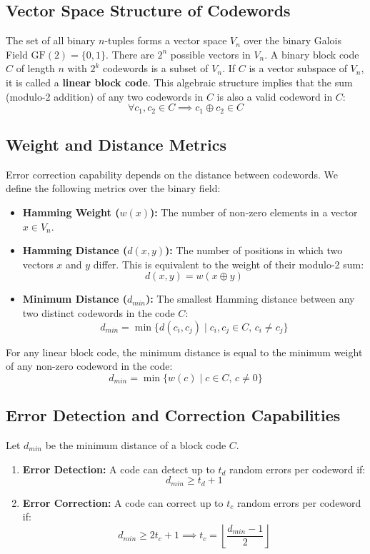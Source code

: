 \documentclass[12pt,a4paper]{article}
\begin{document}
\subsection{Vector Space Structure of Codewords}
The set of all binary $n$-tuples forms a vector space $V_n$ over the binary Galois Field $\text{GF}(2) = \{0, 1\}$. There are $2^n$ possible vectors in $V_n$. A binary block code $C$ of length $n$ with $2^k$ codewords is a subset of $V_n$. If $C$ is a vector subspace of $V_n$, it is called a \textbf{linear block code}. This algebraic structure implies that the sum (modulo-2 addition) of any two codewords in $C$ is also a valid codeword in $C$:
\[ \forall c_1, c_2 \in C \implies c_1 \oplus c_2 \in C \]

\subsection{Weight and Distance Metrics}
Error correction capability depends on the distance between codewords. We define the following metrics over the binary field:
\begin{tcolorbox}[defbox, title={\textbf{Weight and Distance Definitions}}]
\begin{itemize}[leftmargin=*, itemsep=3pt, topsep=0pt]
  \item \textbf{Hamming Weight ($w(x)$):} The number of non-zero elements in a vector $x \in V_n$.
  \item \textbf{Hamming Distance ($d(x, y)$):} The number of positions in which two vectors $x$ and $y$ differ. This is equivalent to the weight of their modulo-2 sum:
    \[ d(x, y) = w(x \oplus y) \]
  \item \textbf{Minimum Distance ($d_{min}$):} The smallest Hamming distance between any two distinct codewords in the code $C$:
    \[ d_{min} = \min \{ d(c_i, c_j) \mid c_i, c_j \in C, \, c_i \neq c_j \} \]
\end{itemize}
\end{tcolorbox}

For any linear block code, the minimum distance is equal to the minimum weight of any non-zero codeword in the code:
\[ d_{min} = \min \{ w(c) \mid c \in C, \, c \neq 0 \} \]

\subsection{Error Detection and Correction Capabilities}
\begin{tcolorbox}[formulabox, title={\textbf{Error Bounds}}]
Let $d_{min}$ be the minimum distance of a block code $C$.
\begin{enumerate}[leftmargin=*, itemsep=3pt, topsep=0pt]
  \item \textbf{Error Detection:} A code can detect up to $t_d$ random errors per codeword if:
    \[ d_{min} \ge t_d + 1 \]
  \item \textbf{Error Correction:} A code can correct up to $t_c$ random errors per codeword if:
    \[ d_{min} \ge 2t_c + 1 \implies t_c = \left\lfloor \frac{d_{min} - 1}{2} \right\rfloor \]
\end{enumerate}
\end{tcolorbox}
\end{document}
